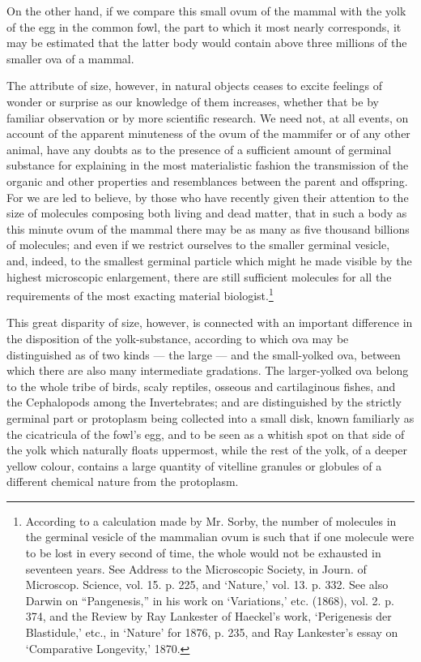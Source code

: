 \documentclass[a4paper, 11pt, oneside, english]{article}
\begin{document}
On the other hand, if we compare this small ovum of the mammal with the yolk of the egg in the common fowl, the part to which it most nearly corresponds, it may be estimated that the latter body would contain above three millions of the smaller ova of a mammal.

The attribute of size, however, in natural objects ceases to excite feelings of wonder or surprise as our knowledge of them increases, whether that be by familiar observation or by more scientific research. We need not, at all events, on account of the apparent minuteness of the ovum of the mammifer or of any other animal, have any doubts as to the presence of a sufficient amount of germinal substance for explaining in the most materialistic fashion the transmission of the organic and other properties and resemblances between the parent and offspring. For we are led to believe, by those who have recently given their attention to the size of molecules composing both living and dead matter, that in such a body as this minute ovum of the mammal there may be as many as five thousand billions of molecules; and even if we restrict ourselves to the smaller germinal vesicle, and, indeed, to the smallest germinal particle which might he made visible by the highest microscopic enlargement, there are still sufficient molecules for all the requirements of the most exacting material biologist.\footnote{According to a calculation made by Mr. Sorby, the number of molecules in the germinal vesicle of the mammalian ovum is such that if one molecule were to be lost in every second of time, the whole would not be exhausted in seventeen years. See Address to the Microscopic Society, in Journ. of Microscop. Science, vol. 15. p. 225, and `Nature,' vol. 13. p. 332. See also Darwin on ``Pangenesis,'' in his work on `Variations,' etc. (1868), vol. 2. p. 374, and the Review by Ray Lankester of Haeckel's work, `Perigenesis der Blastidule,' etc., in `Nature' for 1876, p. 235, and Ray Lankester's essay on `Comparative Longevity,' 1870.}

This great disparity of size, however, is connected with an important difference in the disposition of the yolk-substance, according to which ova may be distinguished as of two kinds --- the large --- and the small-yolked ova, between which there are also many intermediate gradations. The larger-yolked ova belong to the whole tribe of birds, scaly reptiles, osseous and cartilaginous fishes, and the Cephalopods among the Invertebrates; and are distinguished by the strictly germinal part or protoplasm being collected into a small disk, known familiarly as the cicatricula of the fowl's egg, and to be seen as a whitish spot on that side of the yolk which naturally floats uppermost, while the rest of the yolk, of a deeper yellow colour, contains a large quantity of vitelline granules or globules of a different chemical nature from the protoplasm.
\end{document}

